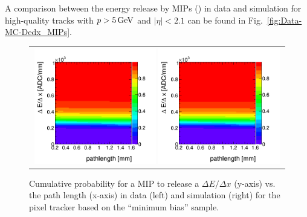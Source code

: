A comparison between the energy release by MIPs (\ias) in data and simulation for high-quality tracks with $p>5\,\text{Ge}\kern-0.06667em\text{V}$ and $|\eta|<2.1$ can be found in Fig.~\ref{fig:Data-MC-Dedx_MIPs}.
\begin{figure}[!tb]
  \centering 
  \begin{tabular}{c}
    \includegraphics[width=0.49\textwidth]{figures/analysis/PixelCalibration/Discriminator_template_data_pixel_2012.png}
    \includegraphics[width=0.49\textwidth]{figures/analysis/PixelCalibration/Discriminator_template_mc_pixel_2012.png}
  \end{tabular}
  \caption{Cumulative probability for a MIP to release a $\Delta E/ \Delta x$ (y-axis) vs. the path length (x-axis) in data (left) and simulation (right) for the pixel tracker based on the ``minimum bias'' sample.}
  \vspace{60pt}
  \label{fig:ProbabilityTemplate}
\end{figure}

